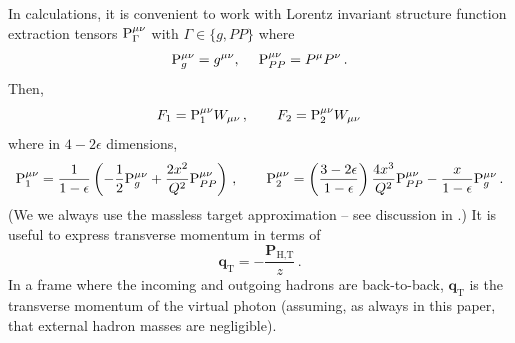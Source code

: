 \documentclass[prd,preprintnumbers,nofootinbib,superscriptaddress,onecolumn,preprint]{revtex4-1}
\newcommand{\T}[2]{\boldsymbol{#1}_{#2\text{T}}}
\newcommand{\THD}[1]{\boldsymbol{#1}_{\text{H,T}}}
\newcommand\3[1]{\boldsymbol{#1}}
\newcommand{\contractor}[1]{\ensuremath{{\rm P}}_{#1}}
\newcommand{\contractortot}[1]{\ensuremath{{\rm P}}_{#1}}
\begin{document}
In calculations, it is convenient to work with Lorentz invariant
structure function extraction tensors
$\contractortot{\Gamma}^{\mu\nu}$ with $\Gamma \in \{ g, PP \}$ 
where
%
\begin{align}
\contractortot{g}^{\mu\nu} = g^{\mu\nu} ,\;\quad
\contractortot{PP}^{\mu\nu} = P^\mu P^\nu \, .
\label{e.PgPPtot}
\end{align}
%
Then, 
%
\begin{equation}
F_1 = \contractortot{1}^{\mu \nu} W_{\mu \nu} \,, \qquad 
F_2 = \contractortot{2}^{\mu \nu} W_{\mu \nu} \,  \label{e.contractorstot}
\end{equation}
%
where in $4 - 2 \epsilon$ dimensions,
%
\begin{equation}
\contractortot{1}^{\mu\nu} = \frac{1}{1 - \epsilon}\left(-\frac{1}{2} \contractortot{g}^{\mu\nu} 
                          +\frac{2 x^2}{Q^2} \contractortot{PP}^{\mu\nu}  \right)
                          \, , \qquad
\contractortot{2}^{\mu\nu} = \left( \frac{3 - 2 \epsilon}{1 - \epsilon} \right) \frac{4  x^3}{Q^2} \contractortot{PP}^{\mu\nu} 
                          - \frac{x}{1 - \epsilon} \contractor{g}^{\mu\nu}
                          \, . 
\end{equation}
%
(We we always use the massless target approximation -- 
see discussion in \cite{Moffat:2019qll}.)
%
It is useful to express transverse momentum in terms of 
%
\begin{equation}
\T{q}{} = -\frac{\THD{P}}{z} \, . 
\end{equation}
%
In a frame where the incoming and outgoing hadrons are back-to-back,
$\T{q}{}$ is the transverse momentum of the virtual photon (assuming, as
always in this paper, that external hadron masses are negligible). 
\end{document}
